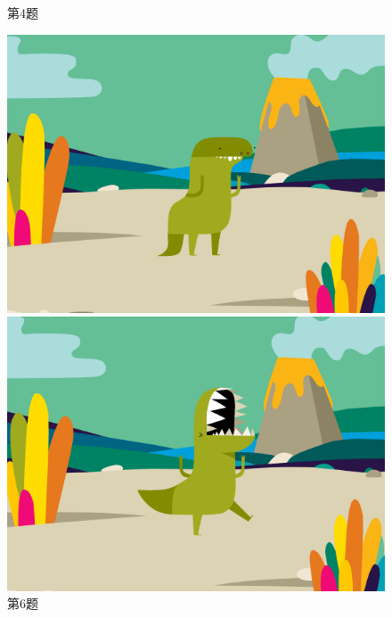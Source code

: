 \documentclass[10pt, a4paper]{article}
\begin{document}
\begin{enumerate}
\begin{figure}[htbp]
\begin{minipage}[t]{.06\textwidth}
                \caption*{第4题}
            \end{minipage}
            \begin{minipage}[t]{.38\textwidth}
                \centering
                \begin{minipage}[t]{.48\textwidth}
                    \centering
                    \includegraphics[width=\textwidth]{6-1.png}
                \end{minipage}
                \begin{minipage}[t]{.48\textwidth}
                    \centering
                    \includegraphics[width=\textwidth]{6-2.png}
                \end{minipage}
                \caption*{第6题}
            \end{minipage}
        \end{figure}


\end{enumerate}
\end{document}
